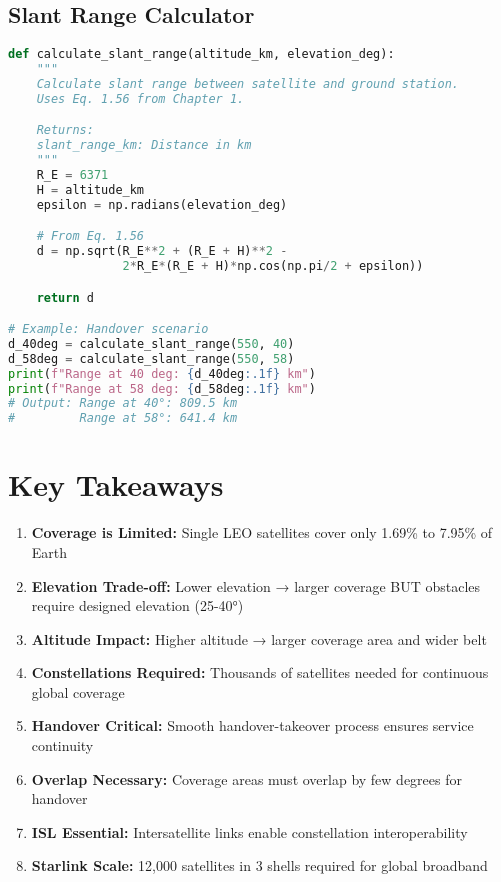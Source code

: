 \documentclass[11pt,letterpaper]{article}
\begin{document}
\subsection{Slant Range Calculator}

\begin{lstlisting}[language=Python, basicstyle=\small, frame=single]
def calculate_slant_range(altitude_km, elevation_deg):
    """
    Calculate slant range between satellite and ground station.
    Uses Eq. 1.56 from Chapter 1.

    Returns:
    slant_range_km: Distance in km
    """
    R_E = 6371
    H = altitude_km
    epsilon = np.radians(elevation_deg)

    # From Eq. 1.56
    d = np.sqrt(R_E**2 + (R_E + H)**2 -
                2*R_E*(R_E + H)*np.cos(np.pi/2 + epsilon))

    return d

# Example: Handover scenario
d_40deg = calculate_slant_range(550, 40)
d_58deg = calculate_slant_range(550, 58)
print(f"Range at 40 deg: {d_40deg:.1f} km")
print(f"Range at 58 deg: {d_58deg:.1f} km")
# Output: Range at 40°: 809.5 km
#         Range at 58°: 641.4 km
\end{lstlisting}

\section{Key Takeaways}

\begin{enumerate}
    \item \textbf{Coverage is Limited:} Single LEO satellites cover only 1.69\% to 7.95\% of Earth
    \item \textbf{Elevation Trade-off:} Lower elevation → larger coverage BUT obstacles require designed elevation (25-40°)
    \item \textbf{Altitude Impact:} Higher altitude → larger coverage area and wider belt
    \item \textbf{Constellations Required:} Thousands of satellites needed for continuous global coverage
    \item \textbf{Handover Critical:} Smooth handover-takeover process ensures service continuity
    \item \textbf{Overlap Necessary:} Coverage areas must overlap by few degrees for handover
    \item \textbf{ISL Essential:} Intersatellite links enable constellation interoperability
    \item \textbf{Starlink Scale:} 12,000 satellites in 3 shells required for global broadband
\end{enumerate}
\end{document}
